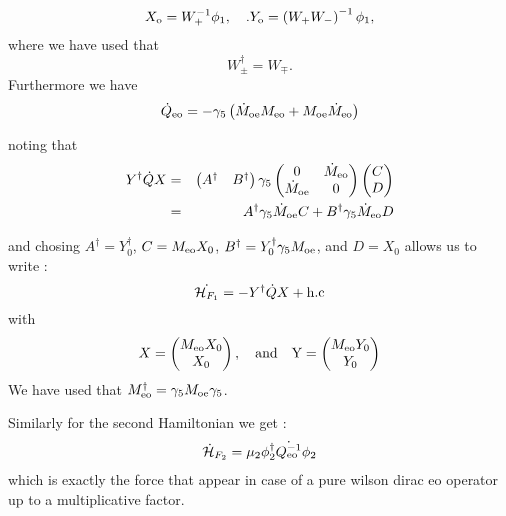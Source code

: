 \documentclass{article}[12pt]
\begin{document}
\begin{equation}
  X_{\rm{o}}=W_+^{-1}\phi_1,\quad. Y_{\rm{o}}= \left(W_+
    W_-\right)^{-1} \phi_1,
\end{equation}
where we have used that
\begin{equation}
  W_\pm^{\dagger} = W_\mp.
\end{equation}
Furthermore we have
\begin{equation}
\dot{Q}_{\rm{eo}} =  -\gamma_5 \left(  \dot{M}_{\rm{oe}}
   M_{\rm{eo}} +  M_{\rm{oe}} \dot{M}_{\rm{eo}}\right)
\end{equation}

noting that
\begin{eqnarray}
  Y ^{\dagger} \dot{Q} X  &=& \begin{pmatrix} A^\dagger &
    B^\dagger \end{pmatrix} \gamma_5 \begin{pmatrix}
 0  & \dot{M}_{\rm{eo}} \\
\dot{M}_{\rm{oe}} & 0\\
\end{pmatrix}  \begin{pmatrix} C \\  D \end{pmatrix} \\
&=&  A^\dagger \gamma_5 \dot{M}_{\rm{oe}}  C + B^\dagger \gamma_5 \dot{M}_{\rm{eo}} D
\end{eqnarray}

and chosing $A^\dagger= Y^\dagger_0 $,
$C =  M_{\rm{eo}} X_0 $, $B^\dagger=
 Y_0^\dagger \gamma_5 M_{\rm{oe}}$, and $D= X_0$ allows us to write :
\begin{equation}
\dot{\mathcal{H}_{F_1}} = -  Y^\dagger \dot{Q} X
  + \rm{h.c}
\end{equation}
with
\begin{equation}
X=\begin{pmatrix} M_{\rm{eo}} X_0
  \\ X_0 \end{pmatrix},\quad \rm{and} \quad Y=\begin{pmatrix}
  M_{\rm{eo}} Y_0
  \\ Y_0 \end{pmatrix}
\end{equation}
We have used that    $M_{\rm{eo}}^{\dagger}=\gamma_5 M_{\rm{oe}} \gamma_5$.



Similarly for the second Hamiltonian we get :
\begin{eqnarray}
\dot{\mathcal{H}}_{F_2} = \mu_2\phi_2^\dagger  \dot{Q_{\rm{eo}}^{-1}}  \phi_2
\end{eqnarray}
which is exactly the force that appear in case of a pure wilson dirac
eo operator up to a multiplicative factor.



\end{document}
